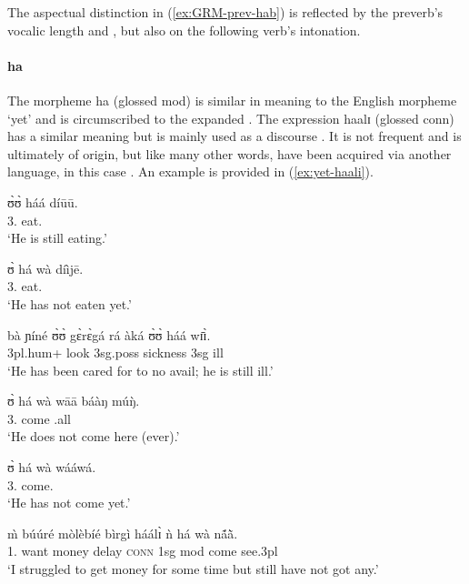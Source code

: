 \begin{exe}
\begin{exe}
\begin{exe}
\begin{exe}
\begin{exe}
\begin{exe}
\begin{exe}
\begin{exe}
\begin{exe}
\begin{exe}
\begin{exe}
\begin{exe}
\z 
 \z

The aspectual distinction in (\ref{ex:GRM-prev-hab}) is reflected by the preverb's vocalic length and , but also on the following verb's intonation.




\paragraph{ha}
\label{sec:GRM-preverb-yet}

The morpheme {\sls ha} (glossed {\sc mod}) is similar in meaning to the English morpheme `yet'  and is circumscribed to the expanded . The expression {\sls haalɪ}  (glossed {\sc conn}) has a similar meaning but is mainly used as a discourse . It is not frequent and is ultimately of  origin, but like many other words, have been acquired via another language, in this case  \citep[157-158]{bald08}. An example is provided in (\ref{ex:yet-haali}).

\ea
\ea\label{ex:vp32.24}
\gll ʊ̀ʊ̀ háá díūū.\\
  {3.\sg}  {\mod} eat.\foc\\
\glt  `He is still eating.' 


\ex\label{ex:vp20.3.2.}
\gll ʊ̀ há wà díìjē.\\
 {3.\sg}  {\mod} {\neg} eat.{\pfv}\\
\glt  `He has not eaten yet.'


\ex\label{ex:vp21.2.1.}
\gll bà ɲíné ʊ̀ʊ̀ gɛ̀rɛ̀gá rá àká ʊ̀ʊ̀ háá wɪ̄ɪ̀.\\
 {\sc 3pl.hum+} look {\sc 3sg.poss} sickness {\foc} {\conn}  {\sc 3sg}
{\mod} ill\\
\glt  `He has been cared for to no avail; he is still ill.' 


\ex\label{ex:vp20.1.1.}
\gll ʊ̀ há  wà wāā báàŋ múŋ̀.\\
    {3.\sg} {\mod}  {\neg} come {\dem} {\quant}.all\\
\glt  `He does not come here (ever).' 

\ex\label{ex:vp20.3.1.}
\gll ʊ̀ há wà wááwá.\\
    {3.\sg} {\mod}   {\neg} come.{\pfv}\\
\glt  `He has not come yet.' 

\ex\label{ex:yet-haali}
 \gll m̀ búúré mòlèbíé bìrgì háálɪ̀ ǹ há wà nã́ã̀.\\
  {1.\sg} want money delay \textsc{conn}  {\sc 1sg}  {\sc mod}  come see.{\sc 3pl} \\
 \glt  `I struggled to get money for some time but still have not got any.' 
 

\end{exe}
\end{exe}
\end{exe}
\end{exe}
\end{exe}
\end{exe}
\end{exe}
\end{exe}
\end{exe}
\end{exe}
\end{exe}
\end{exe}
